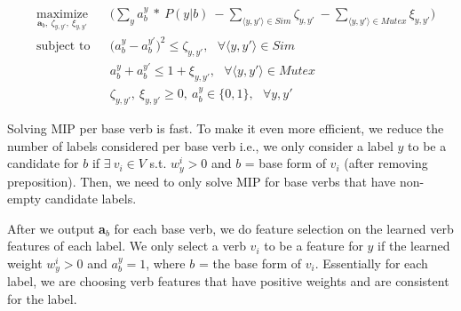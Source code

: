 \scriptsize
\begin{equation}
\begin{aligned}
& \operatorname*{maximize}_{\textbf{a}_b,\ \zeta_{y, y'},\ \xi_{y, y'}}
& & \bigg( \sum_{y} a_{b}^{y}\ *\ P(y | b)\ - \sum_{\langle y, y'\rangle \in Sim} \zeta_{y, y'}\ - \sum_{\langle y, y'\rangle \in Mutex} \xi_{y, y'}\bigg) \\ 
& \text{subject to} & & \big(a_{b}^{y} - a_{b}^{y'}\big)^2 \leq \zeta_{y, y'},\ \ \ \forall \langle y, y'\rangle \in Sim \\
& & & a_{b}^{y} + a_{b}^{y'} \leq 1 + \xi_{y, y'},\ \ \ \forall \langle y, y'\rangle \in Mutex \\
& & & \zeta_{y, y'},\ \xi_{y, y'} \geq 0,\ a_{b}^{y} \in \{0, 1\},\ \ \ \forall y, y'
\label{eqn:mip}
\end{aligned}
\end{equation}
\normalsize

Solving MIP per base verb is fast. To make it even more efficient, we reduce the number of labels considered per base verb i.e., we only consider a label $y$ to be a candidate for $b$ if $\exists\ v_i \in V$ s.t. $w_y^i > 0$ and $b$ = base form of $v_i$ (after removing preposition). Then, we need to only solve MIP for base verbs that have non-empty candidate labels. 

After we output \textbf{a}$_b$ for each base verb, we do feature selection on the learned verb features of each label. We only select a verb $v_i$ to be a feature for $y$ if the learned weight $w_y^i > 0$ and $a_b^{y} = 1$, where $b$ = the base form of $v_i$. Essentially for each label, we are choosing verb features that have positive weights and are consistent for the label.